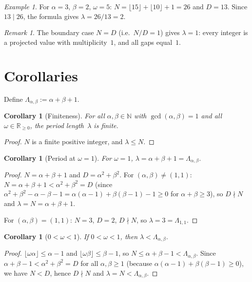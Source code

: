 \documentclass[11pt]{article}
\theoremstyle{plain}
\newtheorem{corollary}[theorem]{Corollary}
\theoremstyle{definition}
\theoremstyle{remark}
\newtheorem{remark}[theorem]{Remark}
\newtheorem{example}[theorem]{Example}
\begin{document}
\begin{example}\label{ex:degenerate2}
For $\alpha = 3$, $\beta = 2$, $\omega = 5$:
$N = \lfloor 15 \rfloor + \lfloor 10 \rfloor + 1 = 26$ and $D = 13$.
Since $13 \mid 26$, the formula gives $\lambda = 26/13 = 2$.
\end{example}

\begin{remark}
The boundary case $N = D$ (i.e.\ $N/D = 1$) gives $\lambda = 1$:
every integer is a projected value with multiplicity~$1$, and all gaps
equal~$1$.
\end{remark}

\section{Corollaries}\label{sec:corollaries}

Define $\Lambda_{\alpha,\beta} := \alpha + \beta + 1$.

\begin{corollary}[Finiteness]\label{cor:finite}
For all $\alpha, \beta \in \mathbb{N}$ with $\gcd(\alpha,\beta)=1$ and
all $\omega \in \mathbb{R}_{\ge 0}$, the period length~$\lambda$ is finite.
\end{corollary}
\begin{proof}
$N$ is a finite positive integer, and $\lambda \le N$.
\end{proof}

\begin{corollary}[Period at $\omega = 1$]\label{cor:omega1}
For $\omega = 1$,\; $\lambda = \alpha + \beta + 1 = \Lambda_{\alpha,\beta}$.
\end{corollary}
\begin{proof}
$N = \alpha + \beta + 1$ and $D = \alpha^2+\beta^2$.
For $(\alpha,\beta) \ne (1,1)$: $N = \alpha+\beta+1 < \alpha^2+\beta^2 = D$
(since $\alpha^2+\beta^2 - \alpha - \beta - 1 = \alpha(\alpha-1) +
\beta(\beta-1) - 1 \ge 0$ for $\alpha+\beta \ge 3$),
so $D \nmid N$ and $\lambda = N = \alpha+\beta+1$.

For $(\alpha,\beta) = (1,1)$: $N = 3$, $D = 2$, $D \nmid N$, so
$\lambda = 3 = \Lambda_{1,1}$.
\end{proof}

\begin{corollary}[$0 < \omega < 1$]\label{cor:small_omega}
If $0 < \omega < 1$, then
$\lambda < \Lambda_{\alpha,\beta}$.
\end{corollary}
\begin{proof}
$\lfloor\omega\alpha\rfloor \le \alpha - 1$ and
$\lfloor\omega\beta\rfloor \le \beta - 1$, so
$N \le \alpha + \beta - 1 < \Lambda_{\alpha,\beta}$.
Since $\alpha + \beta - 1 < \alpha^2 + \beta^2 = D$ for all
$\alpha, \beta \ge 1$ (because $\alpha(\alpha-1) + \beta(\beta-1) \ge 0$),
we have $N < D$, hence $D \nmid N$ and
$\lambda = N < \Lambda_{\alpha,\beta}$.
\end{proof}
\end{document}
